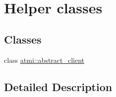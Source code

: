 \hypertarget{group__helpers}{}\section{Helper classes}
\label{group__helpers}
\subsection*{Classes}
\begin{DoxyCompactItemize}
\item 
class \hyperlink{classatmi_1_1abstract__client}{atmi\+::abstract\+\_\+client}
\end{DoxyCompactItemize}


\subsection{Detailed Description}
